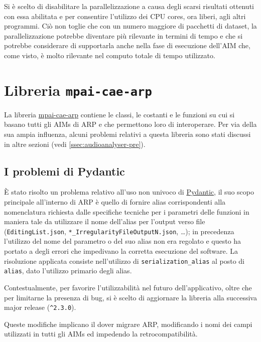 Si è scelto di disabilitare la parallelizzazione a causa degli scarsi risultati ottenuti con essa abilitata e per consentire l'utilizzo dei CPU cores, ora liberi, agli altri programmi.
Ciò non toglie che con un numero maggiore di pacchetti di dataset, la parallelizzazione potrebbe diventare più rilevante in termini di tempo e che si potrebbe considerare di supportarla anche nella fase di esecuzione dell'\ac{AIM} che, come visto, è molto rilevante nel computo totale di tempo utilizzato.


\section{Libreria \texttt{mpai-cae-arp}} \label{sec:lib-mpaicaearp} %
La libreria \href{https://pypi.org/project/mpai-cae-arp/}{mpai-cae-arp} contiene le classi, le costanti e le funzioni su cui si basano tutti gli \acp{AIM} di \ac{ARP} e che permettono loro di interoperare.
Per via della sua ampia influenza, alcuni problemi relativi a questa libreria sono stati discussi in altre sezioni (vedi \ref{ssec:audioanalyser-pre}).


\subsection{I problemi di Pydantic} \label{ssec:mpaicaearp-pydantic}    %
È stato risolto un problema relativo all'uso non univoco di \href{https://docs.pydantic.dev/1.10/}{Pydantic}, il suo scopo principale all'interno di \ac{ARP} è quello di fornire alias corrispondenti alla nomenclatura richiesta dalle specifiche tecniche per i parametri delle funzioni in maniera tale da utilizzare il nome dell'alias per l'output verso file (\texttt{EditingList.json}, \verb|*_IrregularityFileOutputN.json|, \dots); in precedenza l'utilizzo del nome del parametro o del suo alias non era regolato e questo ha portato a degli errori che impedivano la corretta esecuzione del software.
La risoluzione applicata consiste nell'utilizzo di \verb|serialization_alias| al posto di \texttt{alias}, dato l'utilizzo primario degli alias.

Contestualmente, per favorire l'utilizzabilità nel futuro dell'applicativo, oltre che per limitarne la presenza di bug, si è scelto di aggiornare la libreria alla successiva major release (\verb|^2.3.0|).

Queste modifiche implicano il dover migrare \ac{ARP}, modificando i nomi dei campi utilizzati in tutti gli \acp{AIM} ed impedendo la retrocompatibilità.


